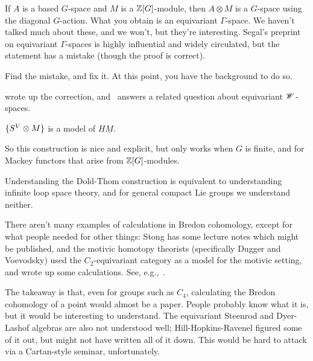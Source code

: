 \begin{cons}
If $A$ is a based $G$-space and $M$ is a $\mathbb Z[G]$-module, then $A\otimes M$ is a $G$-space using the diagonal
$G$-action. What you obtain is an equivariant $\Gamma$-space. We haven't talked much about these, and we won't, but
they're interesting. Segal's preprint on equivariant $\Gamma$-spaces \cite{SegalEquivariant} is highly influential
and widely circulated, but the statement has a mistake (though the proof is correct).
\begin{ex}
Find the mistake, and fix it. At this point, you have the background to do so.
\end{ex}
\cite{Shi89} wrote up the correction, and~\cite{BlumbergWSpace} answers a related question about equivariant
$\mathscr W$-spaces.
\begin{thm}
\label{EMmodel}
$\{S^V\otimes M\}$ is a model of $H\underline M$.
\end{thm}
So this construction is nice and explicit, but only works when $G$ is finite, and for Mackey functors that arise
from $\mathbb Z[G]$-modules.
\end{cons}
Understanding the Dold-Thom construction is equivalent to understanding infinite loop space theory, and for general
compact Lie groups we understand neither.

There aren't many examples of calculations in Bredon cohomology, except for what people needed for other things:
Stong has some lecture notes which might be published, and the motivic homotopy theorists (specifically Dugger and
Voevodsky) used the $C_2$-equivariant category as a model for the motivic setting, and wrote up some calculations.
See, e.g.,~\cite{Lew88, Dug15}.

The takeaway is that, even for groups such as $C_4$, calculating the Bredon cohomology of a point would almost be a
paper. People probably know what it is, but it would be interesting to understand. The equivariant Steenrod and
Dyer-Lashof algebras are also not understood well; Hill-Hopkins-Ravenel figured some of it out, but might not have
written all of it down. This would be hard to attack via a Cartan-style seminar, unfortunately.

